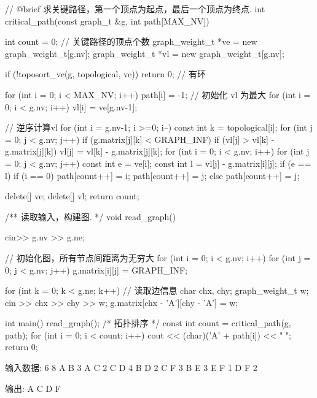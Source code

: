 \begin{Codex}[label=am_graph_critical_path.cpp]
    // @brief 求关键路径，第一个顶点为起点，最后一个顶点为终点.
    int critical_path(const graph_t &g, int path[MAX_NV]) {
        int count = 0;    // 关键路径的顶点个数
        graph_weight_t *ve = new graph_weight_t[g.nv];
        graph_weight_t *vl = new graph_weight_t[g.nv];

        if (!toposort_ve(g, topological, ve)) return 0;  // 有环

        for (int i = 0; i < MAX_NV; i++) path[i] = -1;
        // 初始化 vl 为最大
        for (int i = 0; i < g.nv; i++) vl[i] = ve[g.nv-1];

        // 逆序计算vl
        for (int i = g.nv-1; i >=0; i--) {
            const int k = topological[i];
            for (int j = 0; j < g.nv; j++) {
                if (g.matrix[j][k] < GRAPH_INF) {
                    if (vl[j] > vl[k] - g.matrix[j][k])
                        vl[j] = vl[k] - g.matrix[j][k];
                }
            }
        }
        for (int i = 0; i < g.nv; i++) {
            for (int j = 0; j < g.nv; j++) {
                const int e = ve[i];
                const int l = vl[j] - g.matrix[i][j];
                if (e == l) {
                    if (i == 0) {
                        path[count++] = i;
                        path[count++] = j;
                    } else {
                        path[count++] = j;
                    }
                }
            }
        }

        delete[] ve;
        delete[] vl;
        return count;
    }

    /** 读取输入，构建图. */
    void read_graph() {
        cin>> g.nv >> g.ne;

        // 初始化图，所有节点间距离为无穷大
        for (int i = 0; i < g.nv; i++)
            for (int j = 0; j < g.nv; j++)
                g.matrix[i][j] = GRAPH_INF;

        for (int k = 0; k < g.ne; k++) {  // 读取边信息
            char chx, chy;
            graph_weight_t w;
            cin >> chx >> chy >> w;
            g.matrix[chx - 'A'][chy - 'A'] = w;
        }
    }
    int main() {
        read_graph();
        /* 拓扑排序 */
        const int count = critical_path(g, path);
        for (int i = 0; i < count; i++) {
            cout << (char)('A' + path[i]) << " ";
        }
        return 0;
    }

    输入数据:
        6 8
        A B 3
        A C 2
        C D 4
        B D 2
        C F 3
        B E 3
        E F 1
        D F 2

    输出: A C D F
\end{Codex}

